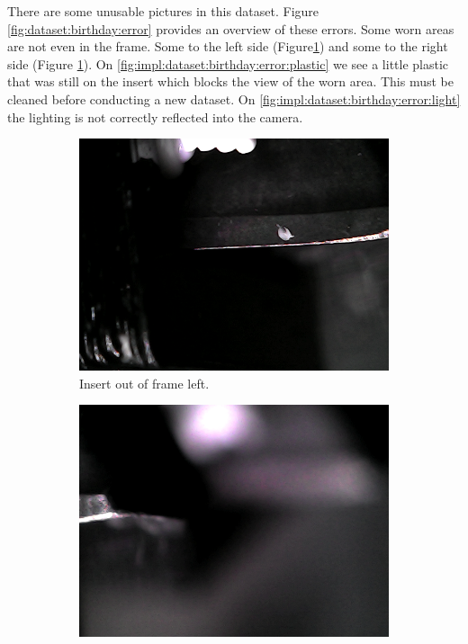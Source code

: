 There are some unusable pictures in this dataset. Figure \ref{fig:dataset:birthday:error} provides an overview of these errors. Some worn areas are not even in the frame. Some to the left side (Figure\ref{fig:impl:dataset:birthday:error:left}) and some to the right side (Figure \ref{fig:impl:dataset:birthday:error:left}). 
On \ref{fig:impl:dataset:birthday:error:plastic} we see a little plastic that was still on the insert which blocks the view of the worn area. This must be cleaned before conducting a new dataset. On \ref{fig:impl:dataset:birthday:error:light} the lighting is not correctly reflected into the camera.

\begin{figure}[hbtp]
	\begin{subfigure}{0.24\textwidth}
		\includegraphics[width=\linewidth, keepaspectratio=true]{./fig/Vision/Dataset/automated_datasets/2_created_datasets/1_Birthday_dataset/b_003_p_010_l_000_nb.png}
		\caption{Insert out of frame left.}
		\label{fig:impl:dataset:birthday:error:left}
	\end{subfigure}
	\hspace*{\fill}
	\begin{subfigure}{0.24\textwidth}
		\includegraphics[width=\linewidth, keepaspectratio=true]{./fig/Vision/Dataset/automated_datasets/2_created_datasets/1_Birthday_dataset/b_003_p_010_l_000_b.png}

\end{subfigure}
\end{figure}
